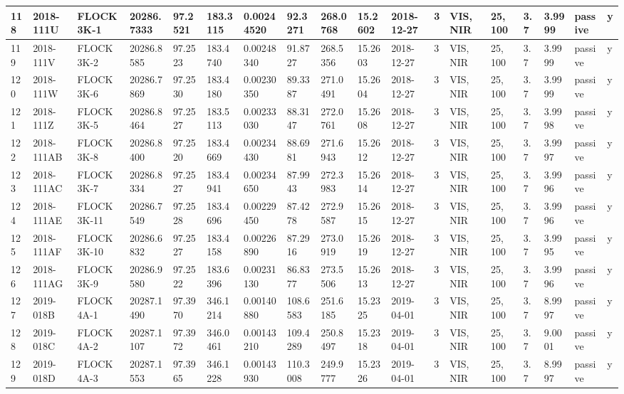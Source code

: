 \documentclass[12pt,a4paper,notitlepage,twoside,openright]{report}
\begin{document}
\begin{longtable}{|l|l|l|l|l|l|l|l|l|l|l|l|l|l|l|l|l|l|}
        118 & 2018-111U & FLOCK 3K-1 & 20286.7333 & 97.2521 & 183.3115 & 0.00244520 & 92.3271 & 268.0768 & 15.2602 & 2018-12-27 & 3 & VIS, NIR & 25, 100 & 3.7 & 3.9999 & passive & y \\ \hline
        119 & 2018-111V & FLOCK 3K-2 & 20286.8585 & 97.2523 & 183.4740 & 0.00248340 & 91.8727 & 268.5356 & 15.2603 & 2018-12-27 & 3 & VIS, NIR & 25, 100 & 3.7 & 3.9999 & passive & y \\ \hline
        120 & 2018-111W & FLOCK 3K-6 & 20286.7869 & 97.2530 & 183.4180 & 0.00230350 & 89.3387 & 271.0491 & 15.2604 & 2018-12-27 & 3 & VIS, NIR & 25, 100 & 3.7 & 3.9999 & passive & y \\ \hline
        121 & 2018-111Z & FLOCK 3K-5 & 20286.8464 & 97.2527 & 183.5113 & 0.00233030 & 88.3147 & 272.0761 & 15.2608 & 2018-12-27 & 3 & VIS, NIR & 25, 100 & 3.7 & 3.9998 & passive & y \\ \hline
        122 & 2018-111AB & FLOCK 3K-8 & 20286.8400 & 97.2520 & 183.4669 & 0.00234430 & 88.6981 & 271.6943 & 15.2612 & 2018-12-27 & 3 & VIS, NIR & 25, 100 & 3.7 & 3.9997 & passive & y \\ \hline
        123 & 2018-111AC & FLOCK 3K-7 & 20286.8334 & 97.2527 & 183.4941 & 0.00234650 & 87.9943 & 272.3983 & 15.2614 & 2018-12-27 & 3 & VIS, NIR & 25, 100 & 3.7 & 3.9996 & passive & y \\ \hline
        124 & 2018-111AE & FLOCK 3K-11 & 20286.7549 & 97.2528 & 183.4696 & 0.00229450 & 87.4278 & 272.9587 & 15.2615 & 2018-12-27 & 3 & VIS, NIR & 25, 100 & 3.7 & 3.9996 & passive & y \\ \hline
        125 & 2018-111AF & FLOCK 3K-10 & 20286.6832 & 97.2527 & 183.4158 & 0.00226890 & 87.2916 & 273.0919 & 15.2619 & 2018-12-27 & 3 & VIS, NIR & 25, 100 & 3.7 & 3.9995 & passive & y \\ \hline
        126 & 2018-111AG & FLOCK 3K-9 & 20286.9580 & 97.2522 & 183.6396 & 0.00231130 & 86.8377 & 273.5506 & 15.2613 & 2018-12-27 & 3 & VIS, NIR & 25, 100 & 3.7 & 3.9996 & passive & y \\ \hline
        127 & 2019-018B & FLOCK 4A-1 & 20287.1490 & 97.3970 & 346.1214 & 0.00140880 & 108.6583 & 251.6185 & 15.2325 & 2019-04-01 & 3 & VIS, NIR & 25, 100 & 3.7 & 8.9997 & passive & y \\ \hline
        128 & 2019-018C & FLOCK 4A-2 & 20287.1107 & 97.3972 & 346.0461 & 0.00143210 & 109.4289 & 250.8497 & 15.2318 & 2019-04-01 & 3 & VIS, NIR & 25, 100 & 3.7 & 9.0001 & passive & y \\ \hline
        129 & 2019-018D & FLOCK 4A-3 & 20287.1553 & 97.3965 & 346.1228 & 0.00143930 & 110.3008 & 249.9777 & 15.2326 & 2019-04-01 & 3 & VIS, NIR & 25, 100 & 3.7 & 8.9997 & passive & y \\ \hline

\end{longtable}
\end{document}
